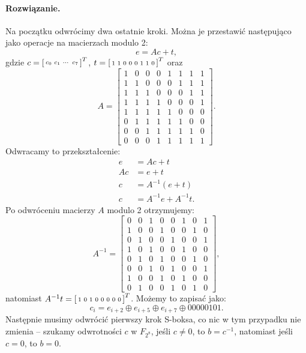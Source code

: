 \documentclass{article}
\newcommand{\xor}{\oplus}
\begin{document}
\paragraph{Rozwiązanie.}
Na początku odwrócimy dwa ostatnie kroki.
Można je przestawić następująco jako operacje na macierzach modulo 2:
\[
    e = Ac + t,
\]
gdzie $c = \begin{bsmallmatrix} c_0 & c_1 & \cdots & c_7 \end{bsmallmatrix}^T$,
$t = \begin{bsmallmatrix} 1 & 1 & 0 & 0 & 0 & 1 & 1 & 0 \end{bsmallmatrix}^T$ oraz
\[
    A = \begin{bmatrix}
        1 & 0 & 0 & 0 & 1 & 1 & 1 & 1 \\
        1 & 1 & 0 & 0 & 0 & 1 & 1 & 1 \\
        1 & 1 & 1 & 0 & 0 & 0 & 1 & 1 \\
        1 & 1 & 1 & 1 & 0 & 0 & 0 & 1 \\
        1 & 1 & 1 & 1 & 1 & 0 & 0 & 0 \\
        0 & 1 & 1 & 1 & 1 & 1 & 0 & 0 \\
        0 & 0 & 1 & 1 & 1 & 1 & 1 & 0 \\
        0 & 0 & 0 & 1 & 1 & 1 & 1 & 1
    \end{bmatrix}.
\]
Odwracamy to przekształcenie:
\begin{align*}
    e &= Ac + t \\
    Ac &= e + t \\
    c &= A^{-1}(e + t) \\
    c &= A^{-1}e + A^{-1}t.
\end{align*}
Po odwróceniu macierzy $A$ modulo 2 otrzymujemy:
\[
    A^{-1} = \begin{bmatrix}
        0 & 0 & 1 & 0 & 0 & 1 & 0 & 1 \\
        1 & 0 & 0 & 1 & 0 & 0 & 1 & 0 \\
        0 & 1 & 0 & 0 & 1 & 0 & 0 & 1 \\
        1 & 0 & 1 & 0 & 0 & 1 & 0 & 0 \\
        0 & 1 & 0 & 1 & 0 & 0 & 1 & 0 \\
        0 & 0 & 1 & 0 & 1 & 0 & 0 & 1 \\
        1 & 0 & 0 & 1 & 0 & 1 & 0 & 0 \\
        0 & 1 & 0 & 0 & 1 & 0 & 1 & 0
    \end{bmatrix},
\]
natomiast $A^{-1}t = \begin{bsmallmatrix} 1 & 0 & 1 & 0 & 0 & 0 & 0 & 0 \end{bsmallmatrix}^T$.
Możemy to zapisać jako:
\[
    c_i = e_{i + 2} \xor e_{i + 5} \xor e_{i + 7} \xor 00000101.
\]
Następnie musimy odwrócić pierwszy krok S-boksa,
co nic w tym przypadku nie zmienia --
szukamy odwrotności $c$ w $F_{2^8}$,
jeśli $c \ne 0$, to $b = c^{-1}$,
natomiast jeśli $c = 0$, to $b = 0$.
\end{document}
